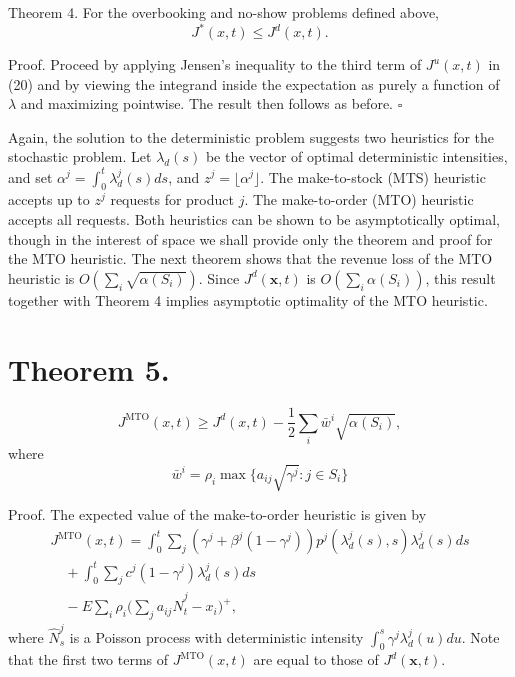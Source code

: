 Theorem 4. For the overbooking and no-show problems defined above,
\[
J^{*} (x, t) \leqslant J^{d} (x, t) .
\]

Proof. Proceed by applying Jensen's inequality to the third term of \(J^{u} (x, t)\) in (20) and by viewing the integrand inside the expectation as purely a function of \(\lambda\) and maximizing pointwise. The result then follows as before. \(\square\)

Again, the solution to the deterministic problem suggests two heuristics for the stochastic problem. Let \(\lambda_d(s)\) be the vector of optimal deterministic intensities, and set \(\alpha^{j} = \int_{0}^{t} \lambda_d^{j}(s) ds\), and \(z^{j} = \lfloor \alpha^{j} \rfloor\). The make-to-stock (MTS) heuristic accepts up to \(z^{j}\) requests for product \(j\). The make-to-order (MTO) heuristic accepts all requests. Both heuristics can be shown to be asymptotically optimal, though in the interest of space we shall provide only the theorem and proof for the MTO heuristic. The next theorem shows that the revenue loss of the MTO heuristic is \(O (\sum_{i} \sqrt{\alpha(S_i)})\). Since \(J^{d} (\boldsymbol{x}, t)\) is \(O (\sum_{i} \alpha(S_i))\), this result together with Theorem 4 implies asymptotic optimality of the MTO heuristic.

\section{Theorem 5.}\label{theorem-5.}
\[
J^{\mathrm{MTO}} (x, t) \geqslant J^{d} (x, t) - \frac{1}{2} \sum_{i} \bar{w}^{i} \sqrt{\alpha(S_i)} ,
\]
where
\[
\bar{w}^{i} = \rho_i \operatorname*{max} \{ a_{ij} \sqrt{\gamma^j} \colon j \in S_i \}
\]

Proof. The expected value of the make-to-order heuristic is given by
\[
\begin{array}{ll}
\displaystyle J^{\mathrm{MTO}} (x, t) = \int_{0}^{t} \sum_{j} {(\gamma^{j} + \beta^{j} (1 - \gamma^{j})) p^{j} (\lambda_d^{j}(s), s) \lambda_d^{j}(s) ds} \\
\displaystyle \quad + \int_{0}^{t} \sum_{j} {c^{j} (1 - \gamma^{j}) \lambda_d^{j}(s) ds} \\
\displaystyle \quad - E \sum_{i} {\rho_i \Big( \sum_{j} {a_{ij} \hat{N}_t^{j} - x_i} \Big)^{+}} ,
\end{array}
\]
where \(\hat{N}_s^{j}\) is a Poisson process with deterministic intensity \(\int_{0}^{s} \gamma^{j} \lambda_d^{j}(u) du\). Note that the first two terms of \(J^{\mathrm{MTO}} (x, t)\) are equal to those of \(J^{d} (\boldsymbol{x}, t)\).

